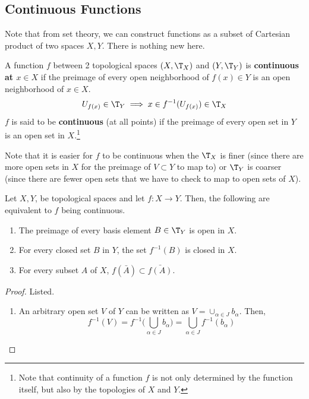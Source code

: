   \begin{example}[Counterexample]
    
  \end{example}

\subsection{Continuous Functions}

  Note that from set theory, we can construct functions as a subset of Cartesian product of two spaces $X, Y$. There is nothing new here. 

  \begin{definition}
		\label{def:continuous_func}
    A function $f$ between 2 topological spaces $(X, \T_{X})$ and $(Y, \T_{Y})$ is \textbf{continuous at $x \in X$} if the preimage of every open neighborhood of $f(x) \in Y$ is an open neighborhood of $x \in X$.
    \begin{equation}
      U_{f(x)} \in \T_{Y} \implies x \in f^{-1}(U_{f(x)}) \in \T_{X}
    \end{equation} 
    $f$ is said to be \textbf{continuous} (at all points) if the preimage of every open set in $Y$ is an open set in $X$.\footnote{Note that continuity of a function $f$ is not only determined by the function itself, but also by the topologies of $X$ and $Y$.}
  \end{definition}

  Note that it is easier for $f$ to be continuous when the $\T_X$ is finer (since there are more open sets in $X$ for the preimage of $V \subset Y$ to map to) or $\T_Y$ is coarser (since there are fewer open sets that we have to check to map to open sets of $X$). 

  \begin{theorem}
    Let $X, Y$, be topological spaces and let $f: X \longrightarrow Y$. Then, the following are equivalent to $f$ being continuous. 
    \begin{enumerate}
      \item The preimage of every basis element $B \in \T_Y$ is open in $X$. 
      \item For every closed set $B$ in $Y$, the set $f^{-1} (B)$ is closed in $X$. 
      \item For every subset $A$ of $X$, $f(\bar{A}) \subset \bar{f(A)}$. 
    \end{enumerate}
  \end{theorem}  
  \begin{proof}
    Listed. 
    \begin{enumerate}
      \item An arbitrary open set $V$ of $Y$ can be written as $V = \cup_{\alpha \in J} b_\alpha$. Then, 
      \begin{equation}
        f^{-1} (V) = f^{-1} \Big( \bigcup_{\alpha \in J} b_\alpha \Big) = \bigcup_{\alpha \in J} f^{-1} (b_\alpha)
      \end{equation}
    \end{enumerate}
  \end{proof}

